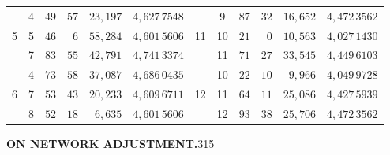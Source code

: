 \begin{center}
\begin{tabular}{|c|c|r@{\;}r@{\;}r|c||c|c|r@{\;}r@{\;}r|c|}
 & 4 & $49$ & $57$ & $23{,}197$ & $4{,}627\,7548$ &  & 9 & $87$ & $32$ & $16{,}652$ & $4{,}472\,3562$\\
5 & 5 & $46$ & $6$ & $58{,}284$ & $4{,}601\,5606$ & 11 & 10 & $21$ & $0$ & $10{,}563$ & $4{,}027\,1430$\\
 & 7 & $83$ & $55$ & $42{,}791$ & $4{,}741\,3374$ &  & 11 & $71$ & $27$ & $33{,}545$ & $4{,}449\,6103$\\[3pt]
 & 4 & $73$ & $58$ & $37{,}087$ & $4{,}686\,0435$ &  & 10 & $22$ & $10$ & $9{,}966$ & $4{,}049\,9728$\\
6 & 7 & $53$ & $43$ & $20{,}233$ & $4{,}609\,6711$ & 12 & 11 & $64$ & $11$ & $25{,}086$ & $4{,}427\,5939$\\
 & 8 & $52$ & $18$ & $6{,}635$ & $4{,}601\,5606$ &  & 12 & $93$ & $38$ & $25{,}706$ & $4{,}472\,3562$\\
\end{tabular}\end{center}
\clearpage
\noindent\textbf{ON NETWORK ADJUSTMENT.}\hfill315
